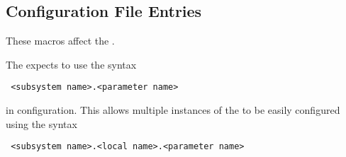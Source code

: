 \subsection{\label{sec:LeaseManager-Config-File-Entries}
Configuration File Entries}

These macros affect the .

The  expects to use the syntax
\begin{verbatim}
 <subsystem name>.<parameter name>
\end{verbatim}
in configuration.
This allows multiple instances of the
 to be easily configured using the syntax
\begin{verbatim}
 <subsystem name>.<local name>.<parameter name>
\end{verbatim}

